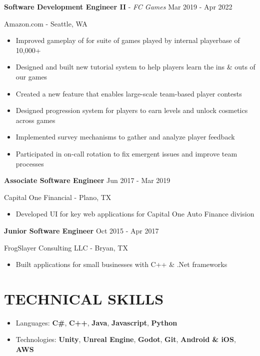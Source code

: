 \documentclass[resmargin,10pt]{res} %
\begin{document}
\begin{resume}
\begin{itemize}
    \end{itemize}
    {\bf Software Development Engineer II} - \textit{FC Games}  \hfill Mar 2019 - Apr 2022
    \begin{ncolumn}{1}
        {Amazon.com} - Seattle, WA
    \end{ncolumn}
    \begin{itemize}
        \setlength\itemsep{-0.1em}
        \item Improved gameplay of for suite of games played by internal playerbase of 10,000+
        \item Designed and built new tutorial system to help players learn the ins \& outs of our games
        \item Created a new feature that enables large-scale team-based player contests
        \item Designed progression system for players to earn levels and unlock cosmetics across games
        \item Implemented survey mechanisms to gather and analyze player feedback
        \item Participated in on-call rotation to fix emergent issues and improve team processes
    \end{itemize}
    {\bf Associate Software Engineer} \hfill Jun 2017 - Mar 2019 
    \begin{ncolumn}{1}
        {Capital One Financial} - Plano, TX
    \end{ncolumn}
    \begin{itemize}
        \item Developed UI for key web applications for Capital One Auto Finance division
    \end{itemize}
    {\bf Junior Software Engineer} \hfill Oct 2015 - Apr 2017
    \begin{ncolumn}{1}
        {FrogSlayer Consulting LLC} - Bryan, TX 
    \end{ncolumn}
    \begin{itemize}
        \setlength\itemsep{-0.0em}
        \item  Built applications for small businesses with C++ \& .Net frameworks
    \end{itemize}

    \section{TECHNICAL SKILLS}
    \begin{itemize}
        \setlength\itemsep{0.1em}
        \item[] {\large Languages:} \textbf{C\#}, \textbf{C++}, \textbf{Java}, \textbf{Javascript}, \textbf{Python}
        \item[] {\large Technologies:} \textbf{Unity}, \textbf{Unreal Engine}, \textbf{Godot}, \textbf{Git}, \textbf{Android \& iOS}, \textbf{AWS}
    \end{itemize}

\end{resume}
\end{document}

